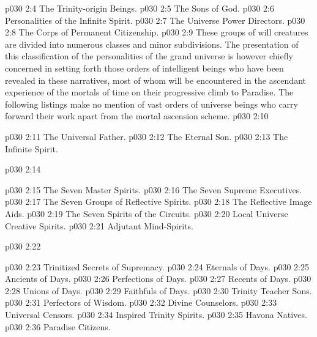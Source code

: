\vs p030 2:4 \bibnobreakspace The Trinity\hyp{}origin Beings.
\vs p030 2:5 \bibnobreakspace The Sons of God.
\vs p030 2:6 \bibnobreakspace Personalities of the Infinite Spirit.
\vs p030 2:7 \bibnobreakspace The Universe Power Directors.
\vs p030 2:8 \bibnobreakspace The Corps of Permanent Citizenship.
\pc \vs p030 2:9 These groups of will creatures are divided into numerous classes and minor subdivisions. The presentation of this classification of the personalities of the grand universe is however chiefly concerned in setting forth those orders of intelligent beings who have been revealed in these narratives, most of whom will be encountered in the ascendant experience of the mortals of time on their progressive climb to Paradise. The following listings make no mention of vast orders of universe beings who carry forward their work apart from the mortal ascension scheme.\plusone
\pc \vs p030 2:10 \bibnobreakspace {}
\begin{ubquote}
\pc \vs p030 2:11 \bibnobreakspace The Universal Father.
\vs p030 2:12 \bibnobreakspace The Eternal Son.
\vs p030 2:13 \bibnobreakspace The Infinite Spirit.
\end{ubquote}
\pc \vs p030 2:14 \bibnobreakspace {}
\begin{ubquote}
\pc \vs p030 2:15 \bibnobreakspace The Seven Master Spirits.
\vs p030 2:16 \bibnobreakspace The Seven Supreme Executives.
\vs p030 2:17 \bibnobreakspace The Seven Groups of Reflective Spirits.
\vs p030 2:18 \bibnobreakspace The Reflective Image Aids.
\vs p030 2:19 \bibnobreakspace The Seven Spirits of the Circuits.
\vs p030 2:20 \bibnobreakspace Local Universe Creative Spirits.
\vs p030 2:21 \bibnobreakspace Adjutant Mind\hyp{}Spirits.
\end{ubquote}
\pc \vs p030 2:22 \bibnobreakspace {}
\begin{ubquote}
\pc \vs p030 2:23 \bibnobreakspace Trinitized Secrets of Supremacy.
\vs p030 2:24 \bibnobreakspace Eternals of Days.
\vs p030 2:25 \bibnobreakspace Ancients of Days.
\vs p030 2:26 \bibnobreakspace Perfections of Days.
\vs p030 2:27 \bibnobreakspace Recents of Days.
\vs p030 2:28 \bibnobreakspace Unions of Days.
\vs p030 2:29 \bibnobreakspace Faithfuls of Days.
\vs p030 2:30 \bibnobreakspace Trinity Teacher Sons.
\vs p030 2:31 \bibnobreakspace Perfectors of Wisdom.
\vs p030 2:32 \bibnobreakspace Divine Counselors.
\vs p030 2:33 \bibnobreakspace Universal Censors.
\vs p030 2:34 \bibnobreakspace Inspired Trinity Spirits.
\vs p030 2:35 \bibnobreakspace Havona Natives.
\vs p030 2:36 \bibnobreakspace Paradise Citizens.
\end{ubquote}
